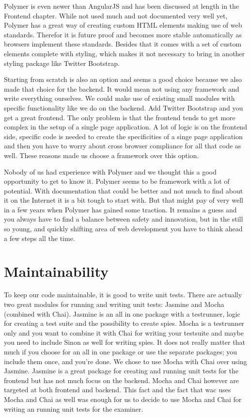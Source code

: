 Polymer is even newer than AngularJS
and has been discussed at length in the Frontend chapter.
While not used much and not documented very well yet,
Polymer has a great way of creating custom HTML elements
making use of web standards.
Therefor it is future proof
and becomes more stable automatically as browsers implement these standards.
Besides that it comes with a set of custom elements
complete with styling,
which makes it not necessary to bring in another styling package
like Twitter Bootstrap.

Starting from scratch is also an option
and seems a good choice because we also made that choice for the backend.
It would mean not using any framework and write everything ourselves.
We could make use of existing small modules with specific functionality
like we do on the backend.
Add Twitter Bootstrap and you get a great frontend.
The only problem is that the frontend tends to get more complex
in the setup of a single page application.
A lot of logic is on the frontend side,
specific code is needed to create the specificities of a singe page application
and then you have to worry about cross browser compliance
for all that code as well.
These reasons made us choose a framework over this option.

Nobody of us had experience with Polymer
and we thought this a good opportunity to get to know it.
Polymer seems to be framework with a lot of potential.
With documentation that could be better
and not much to find about it on the Internet
it is a bit tough to start with.
But that might pay of very well in a few years
when Polymer has gained some traction.
It remains a guess and you always have to find a balance
between safety and innovation,
but in the still so young, and quickly shifting area of web development
you have to think ahead a few steps all the time.

\section{Maintainability}
To keep our code maintainable, it is good to write unit tests.
There are actually two great modules for running and writing unit tests:
Jasmine and Mocha (combined with Chai).
Jasmine is an all in one package with a testrunner,
logic for creating a test suite and the possibility to create spies.
Mocha is a testrunner only
and you want to combine it with Chai for writing your testsuite
and maybe you need to include Sinon as well for writing spies.
It does not really matter that much if you choose for an all in one package
or use the separate packages; you include them once, and you're done.
We chose to use Mocha with Chai over using Jasmine.
Jasmine is a great package for creating and running unit tests for the frontend
but has not much focus on the backend.
Mocha and Chai however are targeted at both frontend and backend.
This fact and the fact that \gls{wac} uses Mocha and Chai as well
was enough for us to decide to use Mocha and Chai
for writing an running unit tests for the \gls{examiner}.
